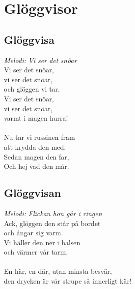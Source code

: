 \chapter{Glöggvisor}
\section{Glöggvisa}
\textit{Melodi: Vi ser det snöar}
\vspace{2mm}\\
Vi ser det snöar,\\
vi ser det snöar,\\
och glöggen vi tar.\\
Vi ser det snöar,\\
vi ser det snöar,\\
varmt i magen hurra!\\
\\
Nu tar vi russinen fram\\
att krydda den med.\\
Sedan magen den far,\\
Och hej vad den mår.\\

\section{Glöggvisan}
\textit{Melodi: Flickan hon går i ringen}
\vspace{2mm}\\
Ack, glöggen den står på bordet\\
och ångar sig varm.\\
Vi häller den ner i halsen\\
och värmer vår tarm.\\
\\
En här, en där, utan minsta besvär,\\
den drycken är vår strupe så innerligt kär!\\
